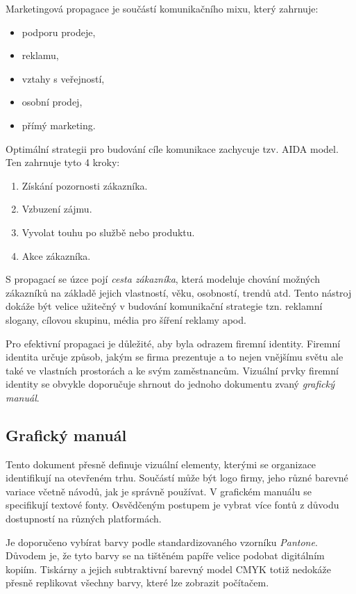     Marketingová propagace je součástí komunikačního mixu, který zahrnuje:
        \begin{itemize}
            \item podporu prodeje,
            \item reklamu,
            \item vztahy s veřejností,
            \item osobní prodej,
            \item přímý marketing.
        \end{itemize}
    Optimální strategii pro budování cíle komunikace zachycuje tzv. AIDA model. Ten zahrnuje tyto 4 kroky:
        \begin{enumerate}
            \item Získání pozornosti zákazníka.
            \item Vzbuzení zájmu.
            \item Vyvolat touhu po službě nebo produktu.
            \item Akce zákazníka.
        \end{enumerate}
    S propagací se úzce pojí \emph{cesta zákazníka}, která modeluje chování možných zákazníků na základě jejich vlastností,
    věku, osobností, trendů atd. Tento nástroj dokáže být velice užitečný v budování komunikační strategie tzn. reklamní slogany,
    cílovou skupinu, média pro šíření reklamy apod. 

    Pro efektivní propagaci je důležité, aby byla odrazem firemní identity. Firemní identita určuje způsob, jakým se firma prezentuje
    a to nejen vnějšímu světu ale také ve vlastních prostorách a ke svým zaměstnancům. Vizuální prvky firemní identity se obvykle doporučuje shrnout do
    jednoho dokumentu zvaný \emph{grafický manuál}.

    \subsection{Grafický manuál}\label{ssec:marketing-graphic-manual}
    Tento dokument přesně definuje vizuální elementy, kterými se organizace identifikují na otevřeném trhu.
    Součástí může být logo firmy, jeho různé barevné variace včetně návodů, jak je správně používat. V grafickém manuálu se specifikují textové fonty.
    Osvědčeným postupem je vybrat více fontů z důvodu dostupností na různých platformách. 

    Je doporučeno vybírat barvy podle standardizovaného vzorníku \emph{Pantone}. Důvodem je,
    že tyto barvy se na tištěném papíře velice podobat digitálním kopiím. Tiskárny a jejich subtraktivní barevný model CMYK totiž nedokáže přesně replikovat
    všechny barvy, které lze zobrazit počítačem. 

